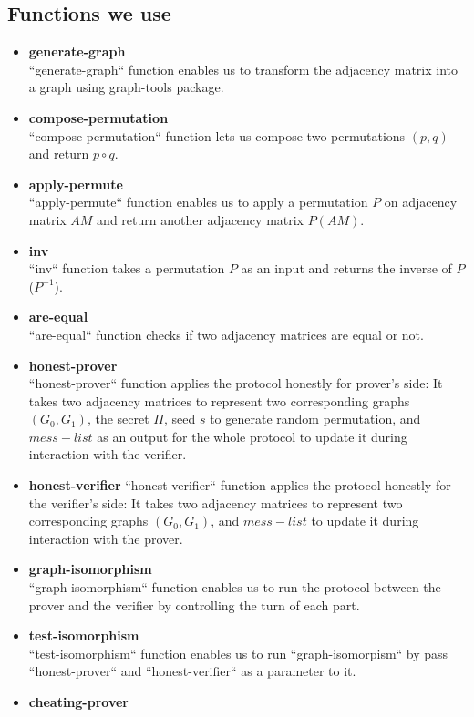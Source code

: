 \documentclass[12pt,a4paper]{article}
\begin{document}
\subsection{Functions we use}
\begin{itemize}
	\item \textbf{generate-graph}\\
``generate-graph`` function enables us to transform the adjacency matrix into a graph using graph-tools package.
	\item \textbf{compose-permutation}\\
	``compose-permutation`` function lets us compose two permutations $(p,q)$ and return $p\circ q$.
	\item \textbf{apply-permute}\\
	``apply-permute`` function enables us to apply a permutation $P$ on adjacency matrix $AM$ and return another adjacency matrix $P(AM)$.
\item \textbf{inv}\\
``inv`` function takes a permutation $P$ as an input and returns the inverse of $P$ ($P^{-1}$). 
\item \textbf{are-equal}\\
``are-equal`` function checks if two adjacency matrices are equal or not.
\item \textbf{honest-prover}\\
``honest-prover`` function applies the protocol honestly for prover's side: It takes two adjacency matrices to represent two corresponding graphs $(G_0,G_1)$, the secret $\Pi$, seed $s$ to generate random permutation, and $mess-list$ as an output for the whole protocol to update it during interaction with the verifier. 
\item \textbf{honest-verifier}
``honest-verifier``  function applies the protocol honestly for the verifier's side: It takes two adjacency matrices to represent two corresponding graphs $(G_0,G_1)$, and $mess-list$ to update it during interaction with the prover. 
\item \textbf{graph-isomorphism}\\
``graph-isomorphism`` function enables us to run the protocol between the prover and the verifier by controlling the turn of each part.
\item \textbf{test-isomorphism}\\
``test-isomorphism`` function enables us to run ``graph-isomorpism`` by pass ``honest-prover`` and ``honest-verifier`` as a parameter to it.
\item \textbf{cheating-prover}\\

\end{itemize}
\end{document}
